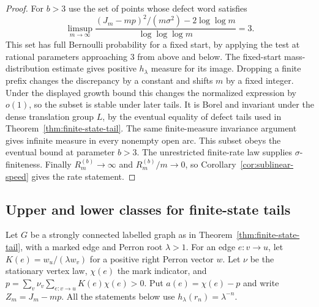\documentclass[11pt]{article}
\theoremstyle{definition}
\theoremstyle{remark}
\begin{document}
\begin{proof}
For $b>3$ use the set of points whose defect word satisfies
\[
 \limsup_{m\to\infty}
 \frac{(J_m-mp)^2/(m\sigma^2)-2\log\log m}{\log\log\log m}=3 .
\]
This set has full Bernoulli probability for a fixed start, by
applying the test at rational parameters approaching $3$ from
above and below. The fixed-start mass-distribution estimate gives
positive $h_\lambda$ measure for its image. Dropping a finite
prefix changes the discrepancy by a constant and shifts $m$ by
a fixed integer. Under the displayed growth bound this changes
the normalized expression by $o(1)$, so the subset is stable under
later tails. It is Borel and invariant under the dense translation
group $L$, by the eventual equality of defect tails used in
Theorem~\ref{thm:finite-state-tail}. The same finite-measure
invariance argument gives infinite measure in every nonempty
open arc. This subset obeys the eventual bound at parameter
$b>3$. The unrestricted finite-rate law supplies $\sigma$-finiteness.
Finally $R^{(b)}_m\to\infty$ and $R^{(b)}_m/m\to0$, so
Corollary~\ref{cor:sublinear-speed} gives the rate statement.
\end{proof}


\subsection{Upper and lower classes for finite-state tails}

Let $G$ be a strongly connected labelled graph as in
Theorem~\ref{thm:finite-state-tail}, with a marked edge and Perron
root $\lambda>1$. For an edge $e:v\to u$, let
$K(e)=w_u/(\lambda w_v)$ for a positive right Perron vector $w$.
Let $\nu$ be the stationary vertex law, $\chi(e)$ the mark indicator,
and $p=\sum_v\nu_v\sum_{e:v\to u}K(e)\chi(e)>0$.
Put $a(e)=\chi(e)-p$ and write $Z_m=J_m-mp$.
All the statements below use $h_\lambda(r_n)=\lambda^{-n}$.
\end{document}

